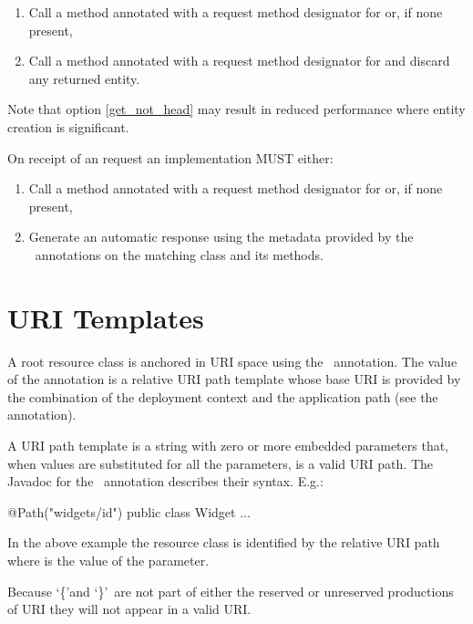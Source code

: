 \begin{enumerate}
\item Call a method annotated with a request method designator for  or, if none present,
\item\label{get_not_head} Call a method annotated with a request method designator for  and discard any returned entity.
\end{enumerate}

Note that option \ref{get_not_head} may result in reduced performance where entity creation is significant.

On receipt of an  request an implementation MUST either:

\begin{enumerate}
\item Call a method annotated with a request method designator for  or, if none present,
\item Generate an automatic response using the metadata provided by the \jaxrs\ annotations on the matching class and its methods.
\end{enumerate}

\section{URI Templates}
\label{uritemplates}

A root resource class is anchored in URI space using the \Path\ annotation. The value of the annotation is a relative URI path template whose base URI is provided by the combination of the deployment context and the application path (see the  annotation).

A URI path template is a string with zero or more embedded parameters that, when values are substituted for all the parameters, is a valid URI\cite{uri} path. The Javadoc for the \Path\ annotation describes their syntax. E.g.:

\begin{listing}{1}
@Path("widgets/{id}")
public class Widget {
  ...
}\end{listing}

In the above example the  resource class is identified by the relative URI path  where  is the value of the  parameter.

\begin{nnnote}Because \lq\{\rq and \lq\}\rq\ are not part of either the reserved or unreserved productions of URI\cite{uri} they will not appear in a valid URI.\end{nnnote}

